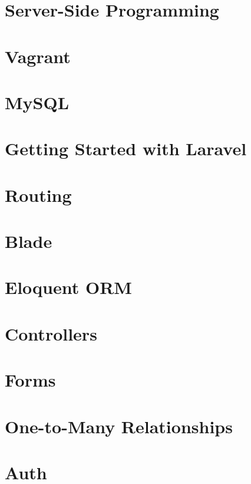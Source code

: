 \documentclass[b5paper,openany]{book}
\begin{document}
\tp


\tableofcontents




\chapter{Server-Side Programming}


\chapter{Vagrant}


\chapter{MySQL}


\chapter{Getting Started with Laravel}


\chapter{Routing}


\chapter{Blade}


\chapter{Eloquent ORM}


\chapter{Controllers}


\chapter{Forms}


\chapter{One-to-Many Relationships}


\chapter{Auth}








\end{document}
